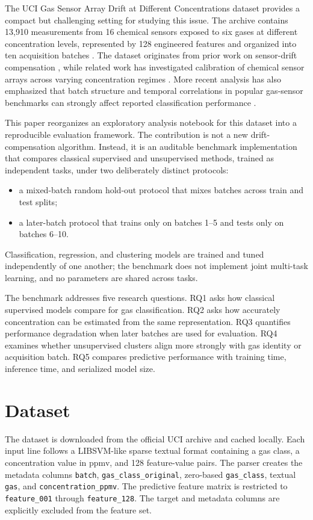 \documentclass[conference]{IEEEtran}
\begin{document}
The UCI Gas Sensor Array Drift at Different Concentrations dataset provides a compact but challenging setting for studying this issue. The archive contains 13,910 measurements from 16 chemical sensors exposed to six gases at different concentration levels, represented by 128 engineered features and organized into ten acquisition batches \cite{uci_gas_270}. The dataset originates from prior work on sensor-drift compensation \cite{vergara2012}, while related work has investigated calibration of chemical sensor arrays across varying concentration regimes \cite{rodriguez2014}. More recent analysis has also emphasized that batch structure and temporal correlations in popular gas-sensor benchmarks can strongly affect reported classification performance \cite{dennler2022}.

This paper reorganizes an exploratory analysis notebook for this dataset into a reproducible evaluation framework. The contribution is not a new drift-compensation algorithm. Instead, it is an auditable benchmark implementation that compares classical supervised and unsupervised methods, trained as independent tasks, under two deliberately distinct protocols:
\begin{itemize}
    \item a mixed-batch random hold-out protocol that mixes batches across train and test splits;
    \item a later-batch protocol that trains only on batches 1--5 and tests only on batches 6--10.
\end{itemize}
Classification, regression, and clustering models are trained and tuned independently of one another; the benchmark does not implement joint multi-task learning, and no parameters are shared across tasks.

The benchmark addresses five research questions. RQ1 asks how classical supervised models compare for gas classification. RQ2 asks how accurately concentration can be estimated from the same representation. RQ3 quantifies performance degradation when later batches are used for evaluation. RQ4 examines whether unsupervised clusters align more strongly with gas identity or acquisition batch. RQ5 compares predictive performance with training time, inference time, and serialized model size.

\section{Dataset}
The dataset is downloaded from the official UCI archive and cached locally. Each input line follows a LIBSVM-like sparse textual format containing a gas class, a concentration value in ppmv, and 128 feature-value pairs. The parser creates the metadata columns \texttt{batch}, \texttt{gas\_class\_original}, zero-based \texttt{gas\_class}, textual \texttt{gas}, and \texttt{concentration\_ppmv}. The predictive feature matrix is restricted to \texttt{feature\_001} through \texttt{feature\_128}. The target and metadata columns are explicitly excluded from the feature set.
\end{document}
